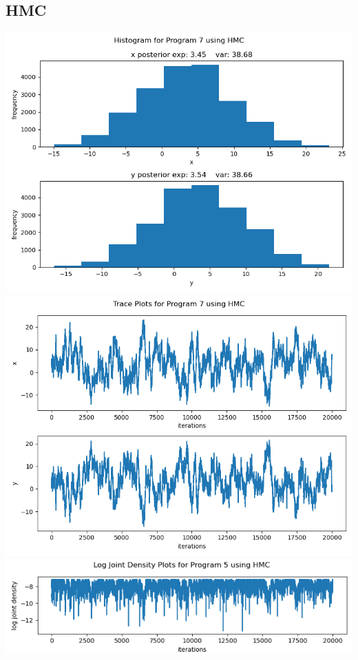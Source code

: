 \documentclass[10pt]{homeworg}
\begin{document}
\subsection{HMC}
\begin{center}
\includegraphics[scale=0.5]{figures/HMC_program_7.png}
\includegraphics[scale=0.5]{figures/trace_HMC_program_7.png}
\includegraphics[scale=0.58]{figures/log_joint_HMC_program_7.png}
\end{center}
\newpage
\end{document}
